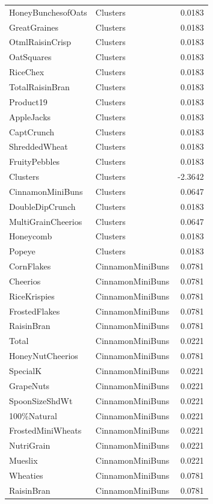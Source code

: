 \begin{longtable}{llr}
HoneyBunchesofOats & Clusters & 0.0183 \\
GreatGraines & Clusters & 0.0183 \\
OtmlRaisinCrisp & Clusters & 0.0183 \\
OatSquares & Clusters & 0.0183 \\
RiceChex & Clusters & 0.0183 \\
TotalRaisinBran & Clusters & 0.0183 \\
Product19 & Clusters & 0.0183 \\
AppleJacks & Clusters & 0.0183 \\
CaptCrunch & Clusters & 0.0183 \\
ShreddedWheat & Clusters & 0.0183 \\
FruityPebbles & Clusters & 0.0183 \\
Clusters & Clusters & -2.3642 \\
CinnamonMiniBuns & Clusters & 0.0647 \\
DoubleDipCrunch & Clusters & 0.0183 \\
MultiGrainCheerios & Clusters & 0.0647 \\
Honeycomb & Clusters & 0.0183 \\
Popeye & Clusters & 0.0183 \\
CornFlakes & CinnamonMiniBuns & 0.0781 \\
Cheerios & CinnamonMiniBuns & 0.0781 \\
RiceKrispies & CinnamonMiniBuns & 0.0781 \\
FrostedFlakes & CinnamonMiniBuns & 0.0781 \\
RaisinBran & CinnamonMiniBuns & 0.0781 \\
Total & CinnamonMiniBuns & 0.0221 \\
HoneyNutCheerios & CinnamonMiniBuns & 0.0781 \\
SpecialK & CinnamonMiniBuns & 0.0221 \\
GrapeNuts & CinnamonMiniBuns & 0.0221 \\
SpoonSizeShdWt & CinnamonMiniBuns & 0.0221 \\
100\%Natural & CinnamonMiniBuns & 0.0221 \\
FrostedMiniWheats & CinnamonMiniBuns & 0.0221 \\
NutriGrain & CinnamonMiniBuns & 0.0221 \\
Mueslix & CinnamonMiniBuns & 0.0221 \\
Wheaties & CinnamonMiniBuns & 0.0781 \\
RaisinBran & CinnamonMiniBuns & 0.0781 \\

\end{longtable}
